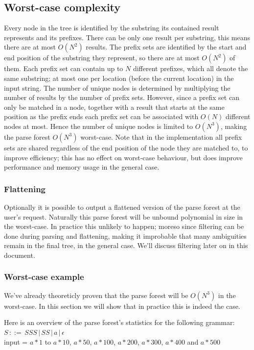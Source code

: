 \documentclass[a4paper,10pt]{article}
\begin{document}
\subsection{Worst-case complexity}
Every node in the tree is identified by the substring its contained result represents and its prefixes. There can be only one result per substring, this means there are at most $O(N^2)$ results. The prefix sets are identified by the start and end position of the substring they represent, so there are at most $O(N^2)$ of them. Each prefix set can contain up to $N$ different prefixes, which all denote the same substring; at most one per location (before the current location) in the input string. The number of unique nodes is determined by multiplying the number of results by the number of prefix sets. However, since a prefix set can only be matched in a node, together with a result that starts at the same position as the prefix ends each prefix set can be associated with $O(N)$ different nodes at most. Hence the number of unique nodes is limited to $O(N^3)$, making the parse forest $O(N^3)$ worst-case. Note that in the implementation all prefix sets are shared regardless of the end position of the node they are matched to, to improve efficiency; this has no effect on worst-case behaviour, but does improve performance and memory usage in the general case.

\subsubsection{Flattening}
Optionally it is possible to output a flattened version of the parse forest at the user's request. Naturally this parse forest will be unbound polynomial in size in the worst-case. In practice this unlikely to happen; moreso since filtering can be done during parsing and flattening, making it improbable that many ambiguities remain in the final tree, in the general case. We'll discuss filtering later on in this document.

\subsubsection{Worst-case example}
We've already theoreticly proven that the parse forest will be $O(N^3)$ in the worst-case. In this section we will show that in practice this is indeed the case.

Here is an overview of the parse forest's statistics for the following grammar:\\
$S\,::=\,SSS\,|\,SS\,|\,a\,|\,\epsilon$\\
input = $a * 1$ to $a * 10$, $a * 50$, $a * 100$, $a * 200$, $a * 300$, $a * 400$ and $a * 500$
\end{document}
